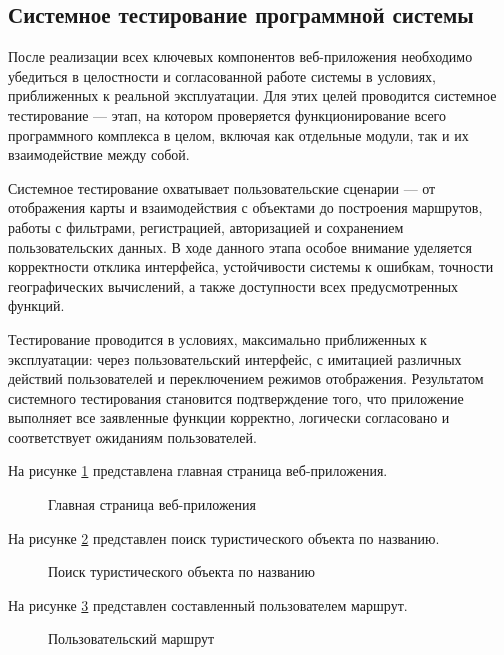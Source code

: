 \subsection{Системное тестирование программной системы}

После реализации всех ключевых компонентов веб-приложения необходимо убедиться в целостности и согласованной работе системы в условиях, приближенных к реальной эксплуатации. Для этих целей проводится системное тестирование — этап, на котором проверяется функционирование всего программного комплекса в целом, включая как отдельные модули, так и их взаимодействие между собой.

Системное тестирование охватывает пользовательские сценарии — от отображения карты и взаимодействия с объектами до построения маршрутов, работы с фильтрами, регистрацией, авторизацией и сохранением пользовательских данных. В ходе данного этапа особое внимание уделяется корректности отклика интерфейса, устойчивости системы к ошибкам, точности географических вычислений, а также доступности всех предусмотренных функций.

Тестирование проводится в условиях, максимально приближенных к эксплуатации: через пользовательский интерфейс, с имитацией различных действий пользователей и переключением режимов отображения. Результатом системного тестирования становится подтверждение того, что приложение выполняет все заявленные функции корректно, логически согласовано и соответствует ожиданиям пользователей.

\newpage
На рисунке \ref{r1:image} представлена главная страница веб-приложения.

\begin{figure}[H] %
\center{\texttt{[image: r1]}}
\caption{Главная страница веб-приложения}
\label{r1:image}
\end{figure}

\newpage
На рисунке \ref{r2:image} представлен поиск туристического объекта по названию.

\begin{figure}[H]
\center{\texttt{[image: r2]}}
\caption{Поиск туристического объекта по названию}
\label{r2:image}
\end{figure}

\newpage
На рисунке \ref{r3:image} представлен составленный пользователем маршрут.

\begin{figure}[H]
\center{\texttt{[image: r3]}}
\caption{Пользовательский маршрут}
\label{r3:image}
\end{figure}

